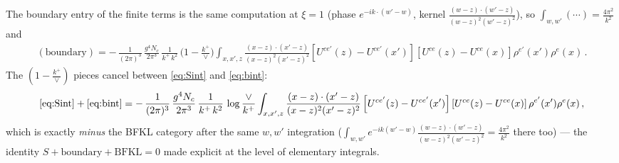 \documentclass[9pt]{article}
\numberwithin{equation}{section}
\begin{document}
The boundary entry of the finite terms is the same computation at $\xi=1$ (phase $e^{-ik\cdot(w'-w)}$, kernel
$\frac{(w-z)\cdot(w'-z)}{(w-z)^{2}(w'-z)^{2}}$), so $\int_{w,w'}(\cdots)=\frac{4\pi^{2}}{k^{2}}$ and
\begin{align}\label{eq:bint}
(\text{boundary})
=-\,\frac{1}{(2\pi)^{3}}\,\frac{g^{4}N_{c}}{2\pi^{3}}\,\frac{1}{k^{+}\,k^{2}}\,
\Big(1-\frac{k^{+}}{\vee}\Big)
\int_{x,x',z}\frac{(x-z)\cdot(x'-z)}{(x-z)^{2}(x'-z)^{2}}
\left[U^{ce'}(z)-U^{ce'}(x')\right]\left[U^{ce}(z)-U^{ce}(x)\right]\rho^{e'}(x')\rho^{e}(x)\,.
\end{align}
The $(1-\frac{k^{+}}{\vee})$ pieces cancel between \eqref{eq:Sint} and \eqref{eq:bint}:
\begin{align}\label{eq:SplusB}
\eqref{eq:Sint}+\eqref{eq:bint}
=-\,\frac{1}{(2\pi)^{3}}\,\frac{g^{4}N_{c}}{2\pi^{3}}\,\frac{1}{k^{+}\,k^{2}}\,
\log\frac{\vee}{k^{+}}
\int_{x,x',z}\frac{(x-z)\cdot(x'-z)}{(x-z)^{2}(x'-z)^{2}}
\left[U^{ce'}(z)-U^{ce'}(x')\right]\left[U^{ce}(z)-U^{ce}(x)\right]\rho^{e'}(x')\rho^{e}(x)\,,
\end{align}
which is exactly \emph{minus} the BFKL category after the same $w,w'$ integration
($\int_{w,w'}e^{-ik(w'-w)}\frac{(w-z)\cdot(w'-z)}{(w-z)^{2}(w'-z)^{2}}=\frac{4\pi^{2}}{k^{2}}$
there too) --- the identity $S+\text{boundary}+\text{BFKL}=0$ made explicit at the level of
elementary integrals.
\end{document}
